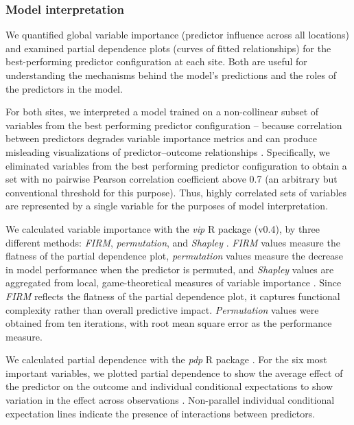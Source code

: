 \documentclass[soil, manuscript]{copernicus}
\begin{document}
\subsubsection{Model interpretation}

We quantified global variable importance (predictor influence across all locations) and examined partial dependence plots (curves of fitted relationships) for the best-performing predictor configuration at each site.
Both are useful for understanding the mechanisms behind the model's predictions and the roles of the predictors in the model.

For both sites, we interpreted a model trained on a non-collinear subset of variables from the best performing predictor configuration -- because correlation between predictors degrades variable importance metrics \citep{stroblConditionalVariableImportance2008, biauRandomForestGuided2016} and can produce misleading visualizations of predictor--outcome relationships \citep{biecekExplanatoryModelAnalysis2021, dwivediExplainableAIXAI2023}.
Specifically, we eliminated variables from the best performing predictor configuration to obtain a set with no pairwise Pearson correlation coefficient above 0.7 (an arbitrary but conventional threshold for this purpose).
Thus, highly correlated sets of variables are represented by a single variable for the purposes of model interpretation.

We calculated variable importance with the \emph{vip} R package (v0.4), by three different methods: \emph{FIRM}, \emph{permutation}, and \emph{Shapley} \citep{greenwellVariableImportancePlots2020}.
\emph{FIRM} values measure the flatness of the partial dependence plot, \emph{permutation} values measure the decrease in model performance when the predictor is permuted, and \emph{Shapley} values are aggregated from local, game-theoretical measures of variable importance \citep{greenwellVariableImportancePlots2020}.
Since \emph{FIRM} reflects the flatness of the partial dependence plot, it captures functional complexity rather than overall predictive impact.
\emph{Permutation} values were obtained from ten iterations, with root mean square error as the performance measure.

We calculated partial dependence with the \emph{pdp} R package \citep[v0.8,][]{greenwellPdpPackageConstructing2017}.
For the six most important variables, we plotted partial dependence to show the average effect of the predictor on the outcome and individual conditional expectations to show variation in the effect across observations \citep{goldsteinPeekingBlackBox2015}.
Non-parallel individual conditional expectation lines indicate the presence of interactions between predictors.
\end{document}
